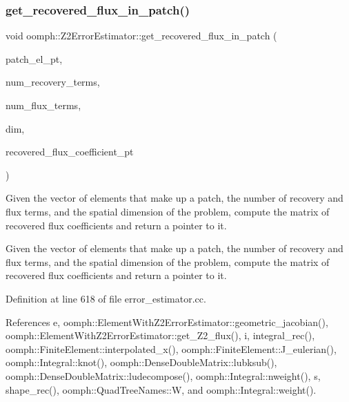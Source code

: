 \subsubsection{\texorpdfstring{get\+\_\+recovered\+\_\+flux\+\_\+in\+\_\+patch()}{get\_recovered\_flux\_in\_patch()}}
{\footnotesize\ttfamily void oomph\+::\+Z2\+Error\+Estimator\+::get\+\_\+recovered\+\_\+flux\+\_\+in\+\_\+patch (\begin{DoxyParamCaption}\item[{const \hyperlink{classoomph_1_1Vector}{Vector}$<$ \hyperlink{classoomph_1_1ElementWithZ2ErrorEstimator}{Element\+With\+Z2\+Error\+Estimator} $\ast$$>$ \&}]{patch\+\_\+el\+\_\+pt,  }\item[{const unsigned \&}]{num\+\_\+recovery\+\_\+terms,  }\item[{const unsigned \&}]{num\+\_\+flux\+\_\+terms,  }\item[{const unsigned \&}]{dim,  }\item[{\hyperlink{classoomph_1_1DenseMatrix}{Dense\+Matrix}$<$ double $>$ $\ast$\&}]{recovered\+\_\+flux\+\_\+coefficient\+\_\+pt }\end{DoxyParamCaption})\hspace{0.3cm}{\ttfamily [private]}}



Given the vector of elements that make up a patch, the number of recovery and flux terms, and the spatial dimension of the problem, compute the matrix of recovered flux coefficients and return a pointer to it. 

Given the vector of elements that make up a patch, the number of recovery and flux terms, and the spatial dimension of the problem, compute the matrix of recovered flux coefficients and return a pointer to it. 

Definition at line 618 of file error\+\_\+estimator.\+cc.



References e, oomph\+::\+Element\+With\+Z2\+Error\+Estimator\+::geometric\+\_\+jacobian(), oomph\+::\+Element\+With\+Z2\+Error\+Estimator\+::get\+\_\+\+Z2\+\_\+flux(), i, integral\+\_\+rec(), oomph\+::\+Finite\+Element\+::interpolated\+\_\+x(), oomph\+::\+Finite\+Element\+::\+J\+\_\+eulerian(), oomph\+::\+Integral\+::knot(), oomph\+::\+Dense\+Double\+Matrix\+::lubksub(), oomph\+::\+Dense\+Double\+Matrix\+::ludecompose(), oomph\+::\+Integral\+::nweight(), s, shape\+\_\+rec(), oomph\+::\+Quad\+Tree\+Names\+::W, and oomph\+::\+Integral\+::weight().



